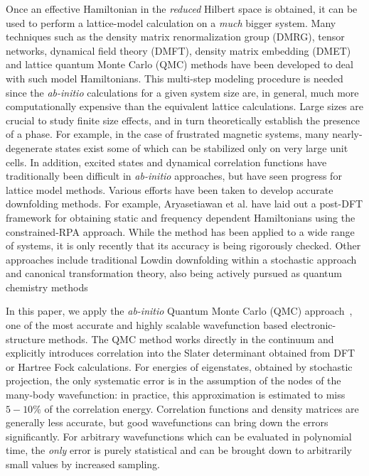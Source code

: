 \documentclass[prl,12pt,onecolumn,nofootinbib,notitlepage,english,superscriptaddress]{revtex4-1}
\newcommand{\HJC}[1]{{\color{RED}{\bf HJC: #1}}}
\begin{document}
\HJC{How has downfolding been performed in the literature. Any success stories or limitations? Why has it been done} 
Once an effective Hamiltonian in the \emph{reduced} Hilbert space 
is obtained, it can be used to perform a lattice-model calculation 
on a \emph{much} bigger system. Many techniques such as the density matrix 
renormalization group (DMRG), tensor networks, 
dynamical field theory (DMFT), density matrix embedding (DMET) 
and lattice quantum Monte Carlo (QMC) methods
have been developed to deal with such model Hamiltonians. 
This multi-step modeling procedure is needed since the \emph{ab-initio} 
calculations for a given system size are, in general, much more 
computationally expensive than the equivalent lattice calculations. 
Large sizes are crucial to study finite size effects, and in turn 
theoretically establish the presence of a phase. For example, in the case of 
frustrated magnetic systems, many nearly-degenerate states exist some of which can be 
stabilized only on very large unit cells. 
In addition, excited states and dynamical correlation functions have traditionally 
been difficult in \emph{ab-initio} approaches, 
but have seen progress for lattice model methods.
Various efforts have been taken to develop accurate downfolding 
methods. For example, Aryasetiawan et al.
have laid out a post-DFT framework for obtaining 
static and frequency dependent Hamiltonians using the 
constrained-RPA approach. While the method has been applied to 
a wide range of systems, 
it is only recently that its accuracy is being rigorously checked. 
Other approaches include traditional Lowdin downfolding 
within a stochastic approach and 
canonical transformation theory, 
also being actively pursued as quantum chemistry 
methods


\HJC{Why are WE downfolding? What new things are we offering? What should we expect? Accuracy, qualitative etc...} 
In this paper, we apply the \emph{ab-initio} 
Quantum Monte Carlo (QMC) approach~\cite{Ceperley_Alder,Foulkes_review}, 
one of the most accurate and highly scalable wavefunction based electronic-structure 
methods. The QMC method works directly in the continuum and 
explicitly introduces correlation into the Slater determinant obtained 
from DFT or Hartree Fock calculations. For energies of eigenstates, obtained 
by stochastic projection, the only systematic error is in the assumption of the 
nodes of the many-body wavefunction: in practice, 
this approximation is estimated to miss $ 5 - 10 \%$ 
of the correlation energy. Correlation functions and density matrices are generally 
less accurate, but good wavefunctions can bring down the errors significantly. 
For arbitrary wavefunctions which can be evaluated in polynomial time, 
the \emph{only} error is purely statistical and 
can be brought down to arbitrarily small values by increased sampling.
\end{document}
